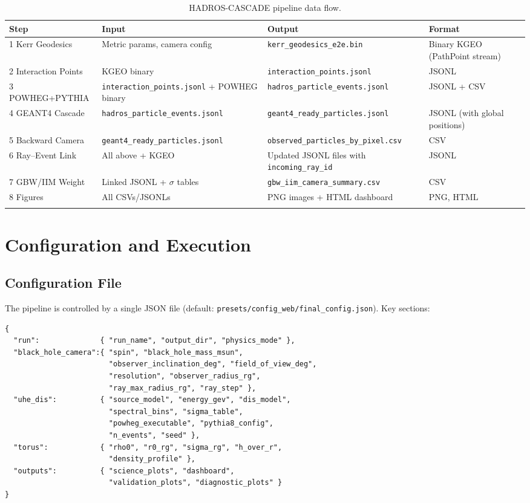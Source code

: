 \documentclass[11pt,a4paper]{article}
\begin{document}
\begin{longtable}{p{2.2cm}p{3.5cm}p{3.5cm}p{4cm}}
\toprule
\textbf{Step} & \textbf{Input} & \textbf{Output} & \textbf{Format} \\
\midrule
\endhead
1 Kerr Geodesics & Metric params, camera config & \texttt{kerr\_geodesics\_e2e.bin} & Binary KGEO (PathPoint stream) \\
\midrule
2 Interaction Points & KGEO binary & \texttt{interaction\_points.jsonl} & JSONL \\
\midrule
3 POWHEG+PYTHIA & \texttt{interaction\_points.jsonl} + POWHEG binary & \texttt{hadros\_particle\_events.jsonl} & JSONL + CSV \\
\midrule
4 GEANT4 Cascade & \texttt{hadros\_particle\_events.jsonl} & \texttt{geant4\_ready\_particles.jsonl} & JSONL (with global positions) \\
\midrule
5 Backward Camera & \texttt{geant4\_ready\_particles.jsonl} & \texttt{observed\_particles\_by\_pixel.csv} & CSV \\
\midrule
6 Ray--Event Link & All above + KGEO & Updated JSONL files with \texttt{incoming\_ray\_id} & JSONL \\
\midrule
7 GBW/IIM Weight & Linked JSONL + $\sigma$ tables & \texttt{gbw\_iim\_camera\_summary.csv} & CSV \\
\midrule
8 Figures & All CSVs/JSONLs & PNG images + HTML dashboard & PNG, HTML \\
\bottomrule
\caption{HADROS-CASCADE pipeline data flow.}
\label{tab:dataflow}
\end{longtable}

\section{Configuration and Execution}
\label{sec:config}

\subsection{Configuration File}

The pipeline is controlled by a single JSON file (default: \texttt{presets/config\_web/final\_config.json}). Key sections:

\begin{lstlisting}[language={}]
{
  "run":              { "run_name", "output_dir", "physics_mode" },
  "black_hole_camera":{ "spin", "black_hole_mass_msun",
                        "observer_inclination_deg", "field_of_view_deg",
                        "resolution", "observer_radius_rg",
                        "ray_max_radius_rg", "ray_step" },
  "uhe_dis":          { "source_model", "energy_gev", "dis_model",
                        "spectral_bins", "sigma_table",
                        "powheg_executable", "pythia8_config",
                        "n_events", "seed" },
  "torus":            { "rho0", "r0_rg", "sigma_rg", "h_over_r",
                        "density_profile" },
  "outputs":          { "science_plots", "dashboard",
                        "validation_plots", "diagnostic_plots" }
}
\end{lstlisting}
\end{document}
